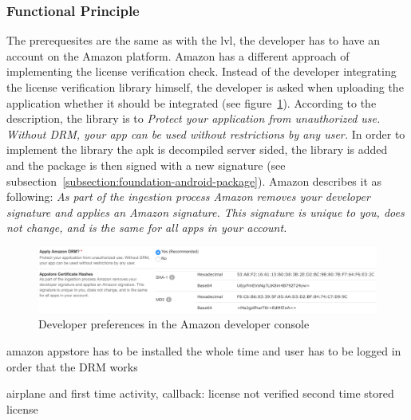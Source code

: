 \subsubsection{Functional Principle} \label{section:license-amazon-functional}
The prerequesites are the same as with the \gls{lvl}, the developer has to have an account on the Amazon platform.
Amazon has a different approach of implementing the license verification check.
Instead of the developer integrating the license verification library himself, the developer is asked when uploading the application whether it should be integrated (see figure~\ref{fig:amazon}).
According to the description, the library is to \textit{Protect your application from unauthorized use. Without DRM, your app can be used without restrictions by any user.} \cite{amazonDeveloper}
In order to implement the library the \gls{apk} is decompiled server sided, the library is added and the package is then signed with a new signature (see subsection~\ref{subsection:foundation-android-package}).
Amazon describes it as following: \textit{As part of the ingestion process Amazon removes your developer signature and applies an Amazon signature. This signature is unique to you, does not change, and is the same for all apps in your account.} \cite{amazonDeveloper}

\begin{figure}[h]
    \centering
    \includegraphics[width=1\textwidth]{data/amazon.png}
    \caption{Developer preferences in the Amazon developer console \cite{amazonDeveloper}}
    \label{fig:amazon}
\end{figure}




amazon appstore has to be installed the whole time and user has to be logged in order that the DRM works

airplane and first time
activity, callback: license not verified
second time
stored license
